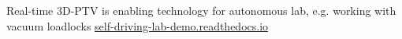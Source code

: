 \begin{frame}[label=app-31b]{Real-time 3D-PTV is enabling technology for autonomous lab, e.g. working with vacuum loadlocks \href{https://self-driving-lab-demo.readthedocs.io/en/latest/index.html}{self-driving-lab-demo.readthedocs.io}}
\begin{columns}
    \centering {} 
    \end{columns}
\end{frame}


    
%    

%


    
